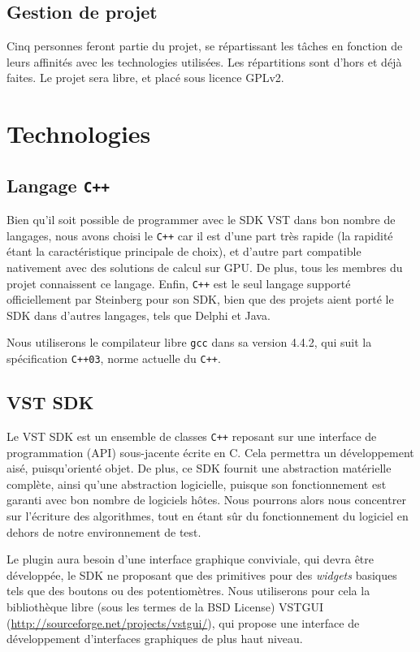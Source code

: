 		\subsection{Gestion de projet}
			Cinq personnes feront partie du projet, se répartissant les tâches en fonction de leurs affinités avec les technologies utilisées. Les répartitions sont d'hors et déjà faites.
			Le projet sera libre, et placé sous licence GPLv2.

	\section{Technologies}
		\subsection{Langage {\tt C++}}
			Bien qu'il soit possible de programmer avec le SDK VST dans bon nombre de langages, nous avons choisi le {\tt C++} car il est d'une part très rapide (la rapidité étant la caractéristique principale de choix), et d'autre part compatible nativement avec des solutions de calcul sur GPU. De plus, tous les membres du projet connaissent ce langage. Enfin, {\tt C++} est le seul langage supporté officiellement par Steinberg pour son SDK, bien que des projets aient porté le SDK dans d'autres langages, tels que Delphi et Java.

			Nous utiliserons le compilateur libre {\tt gcc} dans sa version 4.4.2, qui suit la spécification {\tt C++03}, norme actuelle du {\tt C++}.

		\subsection{VST SDK}
			Le VST SDK est un ensemble de classes {\tt C++} reposant sur une interface de programmation (API) sous-jacente écrite en C. Cela permettra un développement aisé, puisqu'orienté objet. De plus, ce SDK fournit une abstraction matérielle complète, ainsi qu'une abstraction logicielle, puisque son fonctionnement est garanti avec bon nombre de logiciels hôtes. Nous pourrons alors nous concentrer sur l'écriture des algorithmes, tout en étant sûr du fonctionnement du logiciel en dehors de notre environnement de test.

			Le plugin aura besoin d'une interface graphique conviviale, qui devra être développée, le SDK ne proposant que des primitives pour des \emph{widgets} basiques tels que des boutons ou des potentiomètres. Nous utiliserons pour cela la bibliothèque libre (sous les termes de la BSD License) VSTGUI (\url{http://sourceforge.net/projects/vstgui/}), qui propose une interface de développement d'interfaces graphiques de plus haut niveau.


